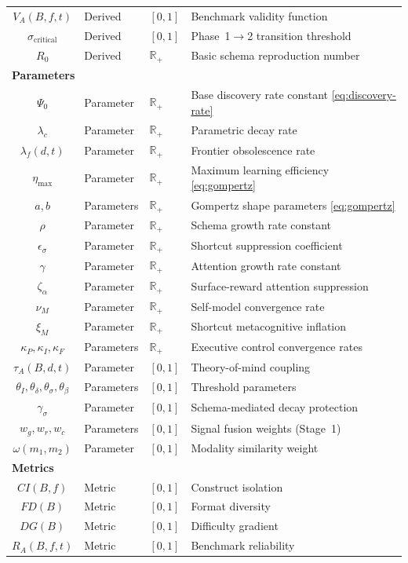 \documentclass[10pt]{article}
\newcommand{\R}{\mathbb{R}}
\begin{document}
\begin{center}
\begin{tabular}{c l l l}
$V_A(B,f,t)$ & Derived & $[0,1]$ & Benchmark validity function \\
$\sigma_{\text{critical}}$ & Derived & $[0,1]$ & Phase~1$\to$2 transition threshold \\
$R_0$ & Derived & $\R_+$ & Basic schema reproduction number \\
\multicolumn{4}{l}{\textbf{Parameters}} \\
$\Psi_0$ & Parameter & $\R_+$ & Base discovery rate constant \hfill\eqref{eq:discovery-rate} \\
$\lambda_c$ & Parameter & $\R_+$ & Parametric decay rate \\
$\lambda_f(d,t)$ & Parameter & $\R_+$ & Frontier obsolescence rate \\
$\eta_{\max}$ & Parameter & $\R_+$ & Maximum learning efficiency \hfill\eqref{eq:gompertz} \\
$a, b$ & Parameters & $\R_+$ & Gompertz shape parameters \hfill\eqref{eq:gompertz} \\
$\rho$ & Parameter & $\R_+$ & Schema growth rate constant \\
$\epsilon_\sigma$ & Parameter & $\R_+$ & Shortcut suppression coefficient \\
$\gamma$ & Parameter & $\R_+$ & Attention growth rate constant \\
$\zeta_\alpha$ & Parameter & $\R_+$ & Surface-reward attention suppression \\
$\nu_M$ & Parameter & $\R_+$ & Self-model convergence rate \\
$\xi_M$ & Parameter & $\R_+$ & Shortcut metacognitive inflation \\
$\kappa_P, \kappa_I, \kappa_F$ & Parameters & $\R_+$ & Executive control convergence rates \\
$\tau_A(B,d,t)$ & Parameter & $[0,1]$ & Theory-of-mind coupling \\
$\theta_I, \theta_\delta, \theta_\sigma, \theta_\beta$ & Parameters & $[0,1]$ & Threshold parameters \\
$\gamma_\sigma$ & Parameter & $[0,1]$ & Schema-mediated decay protection \\
$w_g, w_r, w_c$ & Parameters & $[0,1]$ & Signal fusion weights (Stage~1) \\
$\omega(m_1,m_2)$ & Parameter & $[0,1]$ & Modality similarity weight \\
\multicolumn{4}{l}{\textbf{Metrics}} \\
$CI(B,f)$ & Metric & $[0,1]$ & Construct isolation \\
$FD(B)$ & Metric & $[0,1]$ & Format diversity \\
$DG(B)$ & Metric & $[0,1]$ & Difficulty gradient \\
$R_A(B,f,t)$ & Metric & $[0,1]$ & Benchmark reliability \\
\bottomrule
\end{tabular}
\end{center}
\end{document}
